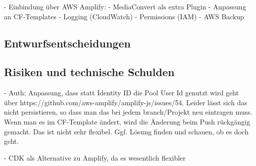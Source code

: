 - Einbindung über \ac{AWS} Amplify:
  - MediaConvert als extra Plugin
  - Anpassung an CF-Templates
- Logging (CloudWatch)
- Permissions (IAM)
- AWS Backup

\subsection{Entwurfsentscheidungen}

\subsection{Risiken und technische Schulden}

- Auth: Anpassung, dass statt Identity ID die Pool User Id genutzt wird geht über https://github.com/aws-amplify/amplify-js/issues/54. Leider lässt sich das nicht persistieren, so dass man das bei jedem branch/Projekt neu eintragen muss. Wenn man es im CF-Template ändert, wird die Änderung beim Push rückgängig gemacht. Das ist nicht sehr flexibel. Ggf. Lösung finden und schauen, ob es doch geht.

- CDK als Alternative zu Amplify, da es wesentlich flexibler
